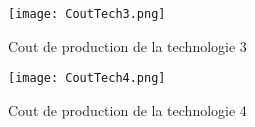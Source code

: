 \begin{figure}
  \caption{\label{coutTech3}Cout de production de la technologie 3}
  \centering
  \texttt{[image: CoutTech3.png]}
\end{figure}

\begin{figure}
  \caption{\label{coutTech4}Cout de production de la technologie 4}
  \centering
  \texttt{[image: CoutTech4.png]}
\end{figure}
